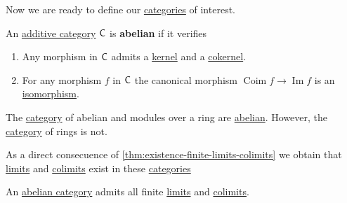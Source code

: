 \documentclass[../../main]{subfiles}
\begin{document}
Now we are ready to define our \hyperref[def:category]{categories} of interest.
\begin{definition}\label{def:abelian-category}
  An \hyperref[def:additive-category]{additive category} \(\mathsf{C}\) is \textbf{abelian} if it verifies
  \begin{enumerate}[label=Ab.\arabic*), ref=Ab.\arabic*]
    \item Any morphism in \(\mathsf{C}\) admits a \hyperref[def:categorical-kernel]{kernel} and a \hyperref[def:categorical-cokernel]{cokernel}.
    \item For any morphism \(f\) in \(\mathsf{C}\) the canonical morphism \(\operatorname{Coim} f \to \operatorname{Im} f\) is an \hyperref[def:categorical-isomorphism]{isomorphism}.
  \end{enumerate}
\end{definition}

\begin{example}
  The \hyperref[def:category]{category} of abelian and modules over a ring are \hyperref[def:abelian-category]{abelian}.
  However, the \hyperref[def:category]{category} of rings is not.
\end{example}


As a direct consecuence of \autoref{thm:existence-finite-limits-colimits} we obtain that \hyperref[def:categorical-limit]{limits} and \hyperref[def:categorical-colimit]{colimits} exist in these \hyperref[def:category]{categories}
\begin{lemma}\label{lemma:abelian-admits-limits-colimits}
  An \hyperref[def:abelian-category]{abelian category} admits all finite \hyperref[def:categorical-limit]{limits} and \hyperref[def:categorical-colimit]{colimits}.
\end{lemma}
\end{document}
